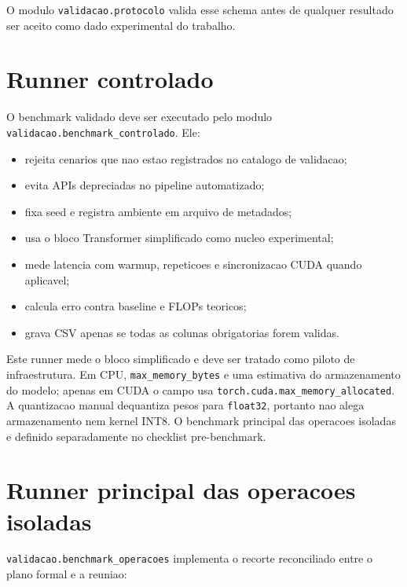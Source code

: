 O modulo \texttt{validacao.\allowbreak{}protocolo} valida esse schema antes de qualquer resultado ser aceito como dado experimental do trabalho.



\section{Runner controlado}




O benchmark validado deve ser executado pelo modulo \texttt{validacao.\allowbreak{}benchmark\_\allowbreak{}controlado}. Ele:


\begin{itemize}
\item rejeita cenarios que nao estao registrados no catalogo de validacao;
\item evita APIs depreciadas no pipeline automatizado;
\item fixa seed e registra ambiente em arquivo de metadados;
\item usa o bloco Transformer simplificado como nucleo experimental;
\item mede latencia com warmup, repeticoes e sincronizacao CUDA quando aplicavel;
\item calcula erro contra baseline e FLOPs teoricos;
\item grava CSV apenas se todas as colunas obrigatorias forem validas.
\end{itemize}







Este runner mede o bloco simplificado e deve ser tratado como piloto de infraestrutura. Em CPU, \texttt{max\_\allowbreak{}memory\_\allowbreak{}bytes} e uma estimativa do armazenamento do modelo; apenas em CUDA o campo usa \texttt{torch.\allowbreak{}cuda.\allowbreak{}max\_\allowbreak{}memory\_\allowbreak{}allocated}. A quantizacao manual dequantiza pesos para \texttt{float32}, portanto nao alega armazenamento nem kernel INT8. O benchmark principal das operacoes isoladas e definido separadamente no checklist pre-benchmark.



\section{Runner principal das operacoes isoladas}




\texttt{validacao.\allowbreak{}benchmark\_\allowbreak{}operacoes} implementa o recorte reconciliado entre o plano formal e a reuniao:


